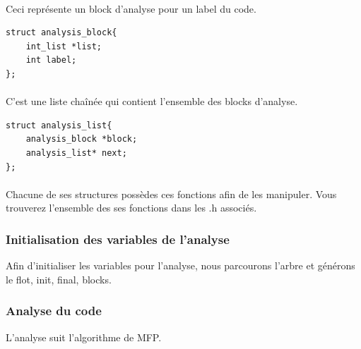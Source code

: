 \documentclass[12pt,a4paper,oneside]{article}
\begin{document}
\paragraph{}
Ceci représente un block d'analyse pour un label du code.
\begin{lstlisting}
struct analysis_block{
	int_list *list;
	int label;
};
\end{lstlisting}

\paragraph{}
C'est une liste chaînée qui contient l'ensemble des blocks d'analyse.
\begin{lstlisting}
struct analysis_list{
	analysis_block *block;
	analysis_list* next;
};
\end{lstlisting}

\paragraph{}
Chacune de ses structures possèdes ces fonctions afin de les manipuler. Vous trouverez l'ensemble des ses fonctions dans les .h associés.

\subsubsection{Initialisation des variables de l'analyse}
Afin d'initialiser les variables pour l'analyse, nous parcourons l'arbre et générons le flot, init, final, blocks.

\subsubsection{Analyse du code}
L'analyse suit l'algorithme de MFP.

\newpage
\end{document}
